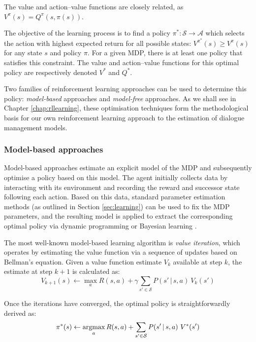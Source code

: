 The value and action--value functions are closely related, as $V^{\pi}(s) = Q^{\pi}(s,\pi(s))$.

The objective of the learning process is to find a policy $\pi^*: \mathcal{S} \rightarrow \mathcal{A}$ which selects the action with highest expected return for all possible states: $V^{\pi^*}(s) \geq V^{\pi}(s)$ for any state $s$ and policy $\pi$.  For a given MDP, there is at least one policy that satisfies this constraint. The value and action--value functions for this optimal policy are respectively denoted $V^*$ and $Q^*$. 

Two families of reinforcement learning approaches can be used to determine this policy: \textit{model-based} approaches and \textit{model-free} approaches. As we shall see in Chapter \ref{chap:rllearning}, these optimisation techniques form the methodological basis for our own reinforcement learning approach to the estimation of dialogue management models. 

\subsubsection*{Model-based approaches}

Model-based approaches estimate an explicit model of the MDP and subsequently optimise a policy based on this model. The agent initially collects data by interacting with its environment and recording the reward and successor state following each action. Based on this data, standard parameter estimation methods (as outlined in Section \ref{sec:learning}) can be used to fix the MDP parameters, and the resulting model is  applied to extract the corresponding optimal policy via dynamic programming \citep{Bertsekas:1996} or Bayesian learning \citep{DeardenFA99}.  

The most well-known model-based learning algorithm is \textit{value iteration}, which operates by estimating the value function via a sequence of updates based on Bellman's equation. Given a value function estimate $V_k$ available at step $k$, the estimate at step $k+1$ is calculated as: 
\begin{equation}
V_{k+1}(s) \leftarrow \max_a R(s,a) + \gamma \sum_{s' \in \mathcal{S}} P(s' \, | \, s, a) \ V_k(s')
\end{equation}

Once the iterations have converged, the optimal policy is straightforwardly derived as:
\begin{equation}
\pi^*(s) \leftarrow \argmax_a R(s,a) + \sum_{s' \in \mathcal{S}} P(s' \, | \, s, a) \ V^*(s')
\end{equation}



